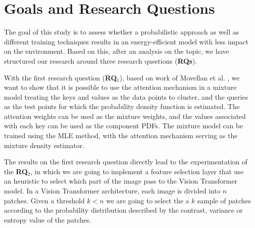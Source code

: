 \section{Goals and Research Questions}
\label{goal}
The goal of this study is to assess whether a probabilistic approach as well as different training techniques results in an energy-efficient model with less impact on the environment. Based on this, after an analysis on the topic, we have structured our research around three research questions (\textbf{RQs}).

\medskip


\medskip
{}

\medskip
{}

\medskip

With the first research question (\textbf{RQ$_{1}$}), based on work of Movellan et al. \cite{DBLP:journals/corr/abs-2010-15583}, we want to show that it is possible to use the attention mechanism in a mixture model treating the keys and values as the data points to cluster, and the queries as the test points for which the probability density function is estimated. The attention weights can be used as the mixture weights, and the values associated with each key can be used as the component PDFs. The mixture model can be trained using the MLE method, with the attention mechanism serving as the mixture density estimator. 

The results on the first research question directly lead to the experimentation of the \textbf{RQ$_{2}$}, in which we are going to implement a feature selection layer that use an heuristic to select which part of the image pass to the Vision Transformer model. In a Vision Transformer architecture, each image is divided into $n$ patches. Given a threshold $k < n$ we are going to select the a $k$ sample of patches according to the probability distribution described by the contrast, variance or entropy value of the patches.

